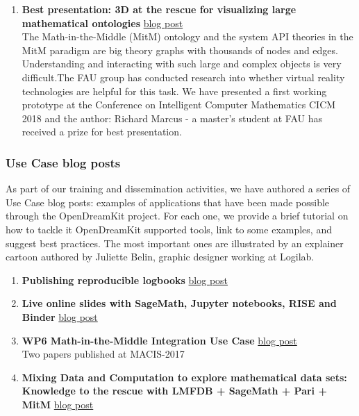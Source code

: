\begin{enumerate}
\item \textbf{Best presentation: 3D at the rescue for visualizing large mathematical ontologies}
  \href{https://opendreamkit.org/2018/08/20/tgview3d.md}{blog post}\\
  The Math-in-the-Middle (MitM) ontology and the system API theories
  in the MitM paradigm are big theory graphs with thousands of nodes
  and edges. Understanding and interacting with such large and complex
  objects is very difficult.The FAU group has conducted research into
  whether virtual reality technologies are helpful for this task. We
  have presented a first working prototype at the Conference on
  Intelligent Computer Mathematics CICM 2018 and the author: Richard
  Marcus - a master's student at FAU has received a prize for best
  presentation.
\end{enumerate}


\subsubsection{Use Case blog posts}

As part of our training and dissemination activities, we have authored
a series of Use Case blog posts: examples of applications that have
been made possible through the OpenDreamKit project. For each one, we
provide a brief tutorial on how to tackle it OpenDreamKit supported
tools, link to some examples, and suggest best practices. The most
important ones are illustrated by an explainer cartoon authored by
Juliette Belin, graphic designer working at Logilab.


\begin{enumerate}
\item \textbf{Publishing reproducible logbooks}
  \href{https://opendreamkit.org/2017/11/02/use-case-publishing-reproducible-notebooks}{blog post}
\item \textbf{Live online slides with SageMath, Jupyter notebooks, RISE and Binder}
  \href{https://opendreamkit.org/2018/07/23/live-online-slides-with-sagemath-jupyter-rise-binder/}{blog post}
\item \textbf{WP6 Math-in-the-Middle Integration Use Case}
  \href{https://opendreamkit.org/2017/10/15/WP6-Usecase/}{blog post}\\
  Two papers published at MACIS-2017
\item \textbf{Mixing Data and Computation to explore mathematical data sets: Knowledge to the rescue with LMFDB + SageMath + Pari + MitM}
  \href{https://opendreamkit.org/2018/05/16/lmfdb-usecase/}{blog post}
\end{enumerate}

